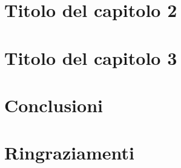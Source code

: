 \chapter{Titolo del capitolo 2}


\chapter{Titolo del capitolo 3}


\chapter{Conclusioni}


\chapter{Ringraziamenti}

















